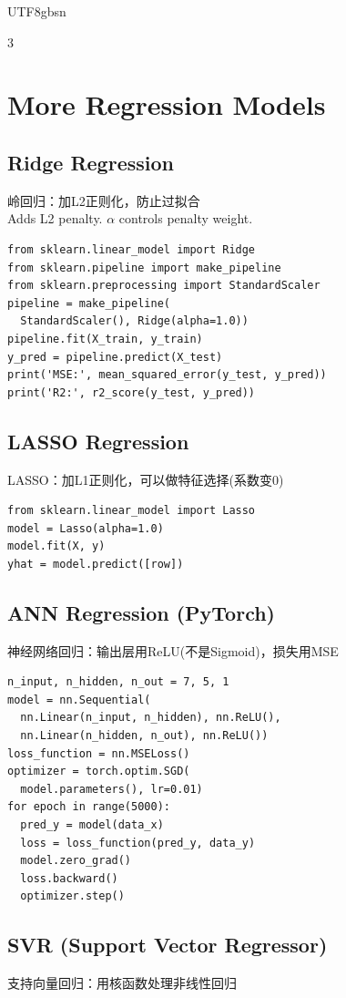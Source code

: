 \documentclass[9pt,landscape,a4paper]{article}
\newcommand{\zhint}[1]{{\scriptsize\color{gray!70!black}#1}}
\begin{document}
\begin{CJK}{UTF8}{gbsn}
\begin{multicols}{3}
\section{More Regression Models}

\subsection{Ridge Regression}
\zhint{岭回归：加L2正则化，防止过拟合}\\
Adds L2 penalty. $\alpha$ controls penalty weight.

\begin{lstlisting}
from sklearn.linear_model import Ridge
from sklearn.pipeline import make_pipeline
from sklearn.preprocessing import StandardScaler
pipeline = make_pipeline(
  StandardScaler(), Ridge(alpha=1.0))
pipeline.fit(X_train, y_train)
y_pred = pipeline.predict(X_test)
print('MSE:', mean_squared_error(y_test, y_pred))
print('R2:', r2_score(y_test, y_pred))
\end{lstlisting}

\subsection{LASSO Regression}
\zhint{LASSO：加L1正则化，可以做特征选择(系数变0)}

\begin{lstlisting}
from sklearn.linear_model import Lasso
model = Lasso(alpha=1.0)
model.fit(X, y)
yhat = model.predict([row])
\end{lstlisting}

\subsection{ANN Regression (PyTorch)}
\zhint{神经网络回归：输出层用ReLU(不是Sigmoid)，损失用MSE}

\begin{lstlisting}
n_input, n_hidden, n_out = 7, 5, 1
model = nn.Sequential(
  nn.Linear(n_input, n_hidden), nn.ReLU(),
  nn.Linear(n_hidden, n_out), nn.ReLU())
loss_function = nn.MSELoss()
optimizer = torch.optim.SGD(
  model.parameters(), lr=0.01)
for epoch in range(5000):
  pred_y = model(data_x)
  loss = loss_function(pred_y, data_y)
  model.zero_grad()
  loss.backward()
  optimizer.step()
\end{lstlisting}

\subsection{SVR (Support Vector Regressor)}
\zhint{支持向量回归：用核函数处理非线性回归}


\end{multicols}
\end{CJK}
\end{document}
